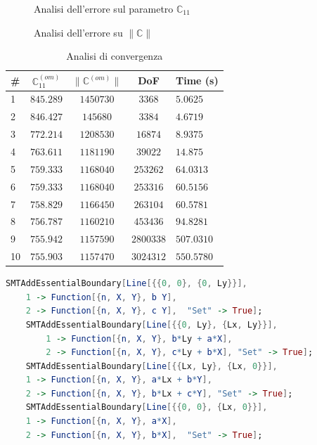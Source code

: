 \documentclass[a4paper,num-refs]{oup-contemporary}
\begin{document}
\begin{figure}[bt!]
	\centering
	\begin{minipage}[b]{0.49\linewidth}

	\def\svgwidth{\linewidth}
	
		\caption{Analisi dell'errore sul parametro $\mathbb C_{11}$}\label{fig:convergence}
	\end{minipage} 
	\begin{minipage}[b]{0.49\linewidth}
	\def\svgwidth{\linewidth}
	
	\caption{Analisi dell'errore su $\|\mathbb C\|$}\label{fig:convergence1}
	\end{minipage} 
	\hfill
	\label{fig:convergenza} 
\end{figure}



\begin{table}[bt!]
	\caption{Analisi di convergenza}\label{tab:convergence}
	\begin{tabular}{l c c c l}
		\toprule
\#&	$\mathbb C_{11}^{(om)}$ & $\| \mathbb C^{(om)}\| $ &DoF &  Time (s)\\
		\midrule

		
	1&		$845.289$ &$1450730 $ &$3368 $ &  $ 5.0625 $\\
			2&	$846.427$ &$145680 $& $3384$ &  $4.6719  $\\
			3&	$ 772.214$ &$1208530 $&$ 16874$  &  $ 8.9375 $\\
			4&$ 763.611$ &$ 1181190$&$ 39022$  &$ 14.875$   \\
			5&$ 759.333$ &$1168040 $&$ 253262$  & $ 64.0313$     \\
		6&	$ 759.333$ &$1168040 $& $ 253316$  &$ 60.5156$     \\
		7&	$758.829 $ &$1166450 $&$ 263104$   &$ 60.5781$     \\
		8&	$ 756.787$ &$ 1160210$&$ 453436$ &$ 94.8281 $     \\
		9&	$ 755.942$ &$1157590 $&$2800338 $  &  $ 507.0310$    \\
		10&	$755.903 $ &$ 1157470$&$ 3024312$  & $550.5780 $    \\
		\bottomrule
	\end{tabular}
\end{table}


\begin{lstlisting}[language=Mathematica,caption=Generazione RVE,label=code_displacem]
	SMTAddEssentialBoundary[Line[{{0, 0}, {0, Ly}}],
	1 -> Function[{n, X, Y}, b Y],
	2 -> Function[{n, X, Y}, c Y], 	"Set" -> True];
	SMTAddEssentialBoundary[Line[{{0, Ly}, {Lx, Ly}}],
		1 -> Function[{n, X, Y}, b*Ly + a*X],
		2 -> Function[{n, X, Y}, c*Ly + b*X], "Set" -> True];
	SMTAddEssentialBoundary[Line[{{Lx, Ly}, {Lx, 0}}], 
	1 -> Function[{n, X, Y}, a*Lx + b*Y],
	2 -> Function[{n, X, Y}, b*Lx + c*Y], "Set" -> True];
	SMTAddEssentialBoundary[Line[{{0, 0}, {Lx, 0}}],
	1 -> Function[{n, X, Y}, a*X],
	2 -> Function[{n, X, Y}, b*X], 	"Set" -> True];
\end{lstlisting}
\end{document}
